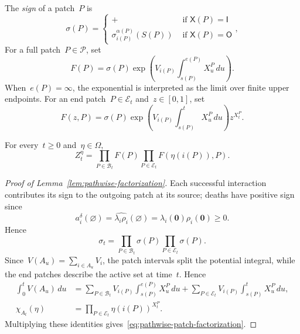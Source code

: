 \documentclass[EJP,preprint,NODS,nobera]{ejpecp}
\newcommand{\bb}[1]{\left(#1\right)}
\newcommand{\mb}[1]{\mathbf{#1}}
\newcommand{\pw}[4]{\left\{\begin{array}{cl}
  #1 &\text{ if } #2 \\
  #3 &\text{ if } #4
\end{array}\right.}
\newcommand{\chg}[1]{{\color{changegreen}#1}}
\begin{document}
\chg{\begin{definition}
\label{def:patch-weights}
The \emph{sign} of a patch~$P$ is
\begin{equation*}
\sigma(P)
=
\pw{+}{\mathsf X(P)=\mathsf I}
{\sigma_{i(P)}^{\alpha(P)}\bb{S(P)}}{\mathsf X(P)=\mathsf O},
\end{equation*}
For a full patch~$P\in\mathcal P$, set
\begin{equation*}
F(P)
=
\sigma(P)
\exp\bb{
V_{i(P)}\int_{s(P)}^{e(P)}X_u^P\,du
}.
\end{equation*}
When~$e(P)=\infty$, the exponential is interpreted as the limit over finite
upper endpoints. For an end patch~$P\in\mathcal E_t$ and~$z\in[0,1]$, set
\begin{equation*}
F(z,P)
=
\sigma(P)
\exp\bb{
V_{i(P)}\int_{s(P)}^tX_u^P\,du
}
z^{X_t^P}.
\end{equation*}
\end{definition}}

\chg{\begin{lemma}
\label{lem:pathwise-factorization}
For every~$t\geq0$ and~$\eta\in\Omega$,
\begin{equation}
\label{eq:pathwise-patch-factorization}
Z_t^\eta
=
\prod_{P\in\mathcal B_t}F(P)
\prod_{P\in\mathcal E_t}F\bb{\eta\bb{i(P)},P}.
\end{equation}
\end{lemma}}

\begin{proof}[\chg{Proof of Lemma~\ref{lem:pathwise-factorization}}]
\chg{Each successful interaction contributes its sign to the outgoing patch at
its source; deaths have positive sign since}
\begin{equation*}
a_i^\delta(\varnothing)
=
\widehat{\lambda_i\rho_i}(\varnothing)
=
\lambda_i(\mb 0)\rho_i(\mb 0)
\geq0.
\end{equation*}
\chg{Hence}
\begin{equation*}
\sigma_t
=
\prod_{P\in\mathcal B_t}\sigma(P)
\prod_{P\in\mathcal E_t}\sigma(P).
\end{equation*}
Since~$V(A_u)=\sum_{i\in A_u}V_i$, the patch intervals split the potential
integral, while the end patches describe the active set at time~$t$. Hence
\begin{align*}
\int_0^tV(A_u)\,du
&=
\sum_{P\in\mathcal B_t}
V_{i(P)}\int_{s(P)}^{e(P)}X_u^P\,du
+
\sum_{P\in\mathcal E_t}
V_{i(P)}\int_{s(P)}^tX_u^P\,du,
\\
\chi_{A_t}(\eta)
&=
\prod_{P\in\mathcal E_t}
\eta\bb{i(P)}^{X_t^P}.
\end{align*}
\chg{Multiplying these identities gives~\eqref{eq:pathwise-patch-factorization}.}
\end{proof}
\end{document}
